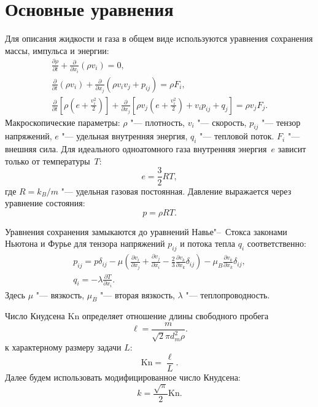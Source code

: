 \documentclass[english,russian,a4paper,10pt]{article}
\newcommand{\Kn}{\mathrm{Kn}}
\newcommand{\pder}[2][]{\frac{\partial#1}{\partial#2}}
\begin{document}
\section{Основные уравнения}

Для описания жидкости и газа в общем виде используются уравнения сохранения массы, импульса и энергии:
\begin{gather}
	\pder[\rho]{t} + \pder{x_i}(\rho v_i) = 0, \label{eq:mass}\\
	\pder{t}(\rho v_i) + \pder{x_j}(\rho v_i v_j + p_{ij}) = \rho F_i, \label{eq:momentum}\\
	\pder{t}\left[\rho\left(e+\frac{v_i^2}2\right)\right] +
		\pder{x_j}\left[\rho v_j\left(e+\frac{v_i^2}2\right)+v_i p_{ij}+q_j\right] = \rho v_j F_j. \label{eq:energy}
\end{gather}
Макроскопические параметры: \(\rho\) "--- плотность, \(v_i\) "--- скорость, \(p_{ij}\) "--- тензор напряжений,
\(e\) "--- удельная внутренняя энергия, \(q_i\) "--- тепловой поток. \(F_i\) "--- внешняя сила.
Для идеального одноатомного газа внутренняя энергия~\(e\) зависит только от температуры~\(T\):
\[ e = \frac32RT,\]
где \(R=k_B/m\) "--- удельная газовая постоянная. Давление выражается через уравнение состояния:
\[ p = \rho RT. \]

Уравнения сохранения замыкаются до уравнений Навье"--~Стокса законами Ньютона и Фурье
для тензора напряжений \(p_{ij}\) и потока тепла \(q_i\) соответственно:
\begin{gather}
	p_{ij} = p\delta_{ij} - \mu\left(\pder[v_i]{x_j}+\pder[v_j]{x_i}-\frac23\pder[v_k]{x_k}\delta_{ij}\right) -
		\mu_B\pder[v_k]{x_k}\delta_{ij}, \label{eq:stress_tensor}\\
	q_i = -\lambda\pder[T]{x_i}. \label{eq:heat_flow}
\end{gather}
Здесь \(\mu\) "--- вязкость, \(\mu_B\) "--- вторая вязкость, \(\lambda\) "--- теплопроводность.

Число Кнудсена \(\Kn\) определяет отношение длины свободного пробега
\begin{equation}\label{eq:ell}
	\ell = \frac{m}{\sqrt2\pi d_m^2 \rho}.
\end{equation}
к характерному размеру задачи \(L\):
\begin{equation}\label{eq:Knudsen}
	\Kn = \frac{\ell}L.
\end{equation}
Далее будем использовать модифицированное число Кнудсена:
\begin{equation}
	k = \frac{\sqrt\pi}2\Kn.
\end{equation}
\end{document}
